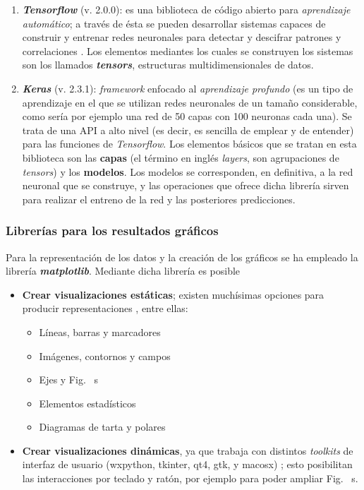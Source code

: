 \begin{enumerate}
    \item \textbf{\textit{Tensorflow}} (v. 2.0.0): es una biblioteca de código abierto para \textit{aprendizaje automático}; a través de ésta se pueden desarrollar sistemas capaces de construir y entrenar redes neuronales para detectar y descifrar patrones y correlaciones \cite{tensorflowWikipedia}. Los elementos mediantes los cuales se construyen los sistemas son los llamados \textit{\textbf{tensors}}, estructuras multidimensionales de datos. 
    \item \textbf{\textit{Keras}} (v. 2.3.1): \textit{framework} enfocado al \textit{aprendizaje profundo} (es un tipo de aprendizaje en el que se utilizan redes neuronales de un tamaño considerable, como sería por ejemplo una red de 50 capas con 100 neuronas cada una). Se trata de una API a alto nivel (es decir, es sencilla de emplear y de entender) para las funciones de \textit{Tensorflow}. Los elementos básicos que se tratan en esta biblioteca son las \textbf{capas} (el término en inglés \textit{layers}, son agrupaciones de \textit{tensors}) y los \textbf{modelos}. Los modelos se corresponden, en definitiva, a la red neuronal que se construye, y las operaciones que ofrece dicha librería sirven para realizar el entreno de la red y las posteriores predicciones. 
\end{enumerate}

\subsubsection{Librerías para los resultados gráficos}

Para la representación de los datos y la creación de los gráficos se ha empleado la librería \textbf{\textit{matplotlib}}. Mediante dicha librería es posible 

\begin{itemize}
    \item \textbf{Crear visualizaciones estáticas}; existen muchísimas opciones para producir representaciones \cite{matplotlibGallery}, entre ellas: 
    \begin{itemize}
        \item Líneas, barras y marcadores
        \item Imágenes, contornos y campos
        \item Ejes y Fig. ~s
        \item Elementos estadísticos
        \item Diagramas de tarta y polares
    \end{itemize}
    \item \textbf{Crear visualizaciones dinámicas}, ya que trabaja con distintos \textit{toolkits} de interfaz de usuario (wxpython, tkinter, qt4, gtk, y macosx) \cite{matplotlibUserEvents}; esto posibilitan las interacciones por teclado y ratón, por ejemplo para poder ampliar Fig. ~s. 
\end{itemize}

